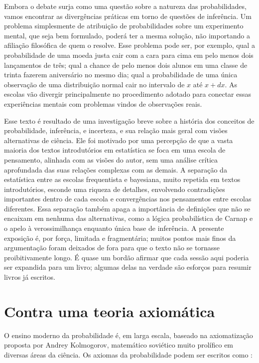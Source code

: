 Embora o debate surja como uma questão sobre a natureza das probabilidades, vamos encontrar as divergências práticas
em torno de questões de inferência. Um problema simplesmente de atribuição de probabilidades sobre um experimento mental,
que seja bem formulado, poderá ter a mesma solução, não importando a afiliação filosófica de quem o resolve. Esse problema 
pode ser, por exemplo, qual a probabilidade de uma moeda justa cair com a cara para cima em pelo menos dois lançamentos de 
três; qual a chance de pelo menos dois alunos em uma classe de trinta fazerem aniversário no mesmo dia; qual a probabilidade 
de uma única observação de uma distribuição normal cair no intervalo de $x$ até $x+dx$. As escolas vão divergir principalmente
no procedimento adotado para conectar essas experiências mentais com problemas vindos de observações reais. 

Esse texto é resultado de uma investigação breve sobre a história dos conceitos de probabilidade, inferência, e incerteza,
e sua relação mais geral com visões alternativas de ciência. Ele foi motivado por uma percepção de que a vasta maioria dos
textos introdutórios em estatística se foca em uma escola de pensamento, alinhada com as visões do autor, sem uma análise crítica
aprofundada das suas relações complexas com as demais. A separação da estatística entre as escolas frequentista e bayesiana,
muito repetida em textos introdutórios, esconde uma riqueza de detalhes, envolvendo contradições importantes dentro de cada
escola e convergências nos pensamentos entre escolas diferentes. Essa separação também apaga a importância de definições que
não se encaixam em nenhuma das alternativas, como a lógica probabilística de Carnap e o apelo à verossimilhança enquanto 
única base de inferência. A presente exposição é, por força, limitada e fragmentária; muitos pontos mais finos da argumentação
foram deixados de fora para que o texto não se tornasse proibitivamente longo. É quase um bordão afirmar que cada 
sessão aqui poderia ser expandida para um livro; algumas delas na verdade são esforços para resumir livros já escritos.

\section{Contra uma teoria axiomática}\label{sec:axiomatica}
O ensino moderno da probabilidade é, em larga escala, baseado na axiomatização proposta por Andrey Kolmogorov, matemático
soviético muito prolífico em diversas áreas da ciência. Os axiomas da probabilidade podem ser escritos como \citep{Morettin09}:

